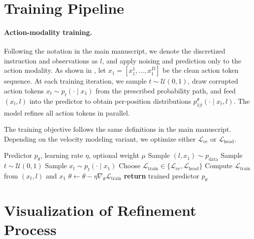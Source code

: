\section{Training Pipeline}
\label{sec:training_pipeline}

\paragraph{Action-modality training.}

Following the notation in the main manuscript, we denote the discretized instruction and observations as $l$, and apply noising and prediction only to the action modality. 
As shown in ,
let $x_1=[x_1^1,\ldots,x_1^D]$ be the clean action token sequence. At each training iteration, we sample $t\sim\mathcal{U}(0,1)$, draw corrupted action tokens $x_t\sim p_t(\cdot\mid x_1)$ from the prescribed probability path, and feed $(x_t, l)$ into the predictor to obtain per-position distributions $p_{1|t}^{\theta}(\cdot\mid x_t, l)$. The model refines all action tokens in parallel.

The training objective follows the same definitions in the main manuscript. Depending on the velocity modeling variant, we optimize either $\mathcal{L}_{\text{ce}}$ or $\mathcal{L}_{\text{head}}$.

\begin{algorithm}[t]
\caption{Action-Modality DFM Training}
\label{alg:action_dfm_training}
\begin{algorithmic}[1]
\REQUIRE Predictor $p_\theta$, learning rate $\eta$, optional weight $\mu$
\REPEAT
    \STATE Sample $(l,x_1)\sim p_{\text{data}}$
    \STATE Sample $t\sim\mathcal{U}(0,1)$
    \STATE Sample $x_t\sim p_t(\cdot\mid x_1)$
    \STATE Choose $\mathcal{L}_{\text{train}}\in\{\mathcal{L}_{\text{ce}},\mathcal{L}_{\text{head}}\}$
    \STATE Compute $\mathcal{L}_{\text{train}}$ from $(x_t,l)$ and $x_1$
    \STATE $\theta\leftarrow\theta-\eta\nabla_\theta\mathcal{L}_{\text{train}}$
\STATE \textbf{return} trained predictor $p_\theta$
\end{algorithmic}
\end{algorithm}

\section{Visualization of Refinement Process}
\label{sec:space_visualization}

